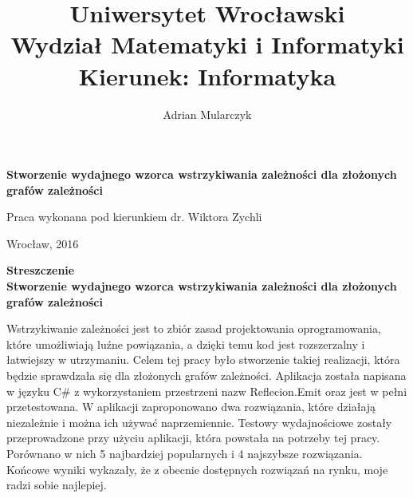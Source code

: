 \documentclass[12pt]{article}
\title{\LARGE{Uniwersytet Wrocławski}\\
\Large{Wydział Matematyki i Informatyki}\\
\large{Kierunek: Informatyka}}
\date{}
\begin{document}
\pagestyle{empty}

\begin{titlepage}
\maketitle
\thispagestyle{empty}


\begin{center}
\author{\LARGE{Adrian Mularczyk}}
\vspace{30pt}

\huge{\textbf{Stworzenie wydajnego wzorca wstrzykiwania zależności dla złożonych grafów zależności}}
\vspace{50pt}
\end{center}

\begin{flushright}
\large{Praca wykonana pod kierunkiem}
\large{dr. Wiktora Zychli}
\end{flushright}

\vfill
\begin{center}
\begin{large}
Wrocław, 2016
\end{large}
\end{center}
\end{titlepage}

\setlength{\parindent}{0pt}	%
\setlength{\parskip}{1.5ex} 
\renewcommand*{\figurename}{Rys.}
\renewcommand*{\tablename}{Tab.} 
\renewcommand{\captionsize}{\small}

\setlength{\intextsep}{0pt}

\clearpage

\tableofcontents



\clearpage
\begin{center}
\textbf{Streszczenie}\\
\vspace{16pt}
\textbf{Stworzenie wydajnego wzorca wstrzykiwania zależności dla złożonych grafów zależności}
\end{center}
Wstrzykiwanie zależności jest to zbiór zasad projektowania oprogramowania, które umożliwiają luźne powiązania, a dzięki temu kod jest rozszerzalny i łatwiejszy w utrzymaniu. Celem tej pracy było stworzenie takiej realizacji, która będzie sprawdzała się dla złożonych grafów zależności. Aplikacja została napisana w języku C\# z wykorzystaniem przestrzeni nazw Reflecion.Emit oraz jest w pełni przetestowana. W aplikacji zaproponowano dwa rozwiązania, które działają niezależnie i można ich używać naprzemiennie. Testowy wydajnościowe zostały przeprowadzone przy użyciu aplikacji, która powstała na potrzeby tej pracy. Porównano w nich 5 najbardziej popularnych i 4 najszybsze rozwiązania. Końcowe wyniki wykazały, że z obecnie dostępnych rozwiązań na rynku, moje radzi sobie najlepiej.
\end{document}
